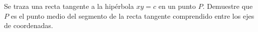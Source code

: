 \item Se traza una recta tangente a la hipérbola $xy = c$ en un punto $P$. Demuestre que $P$ es el punto medio del segmento de la recta tangente comprendido entre los ejes de coordenadas.
